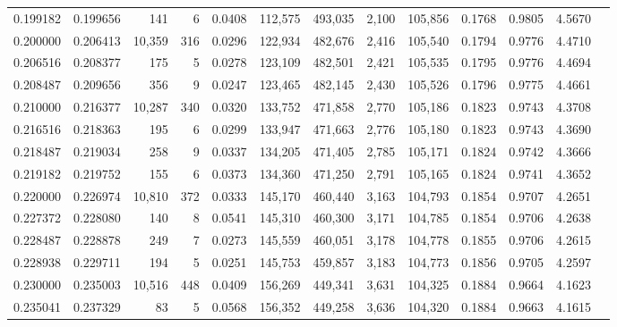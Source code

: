 \begin{tabular}{rrrrrrrrrrrrr}
0.199182 & 0.199656 &    141 &     6 &                                     0.0408 & 112,575 & 493,035 &   2,100 & 105,856 & 0.1768 & 0.9805 & 4.5670 \\
0.200000 & 0.206413 & 10,359 &   316 &                                     0.0296 & 122,934 & 482,676 &   2,416 & 105,540 & 0.1794 & 0.9776 & 4.4710 \\
0.206516 & 0.208377 &    175 &     5 &                                     0.0278 & 123,109 & 482,501 &   2,421 & 105,535 & 0.1795 & 0.9776 & 4.4694 \\
0.208487 & 0.209656 &    356 &     9 &                                     0.0247 & 123,465 & 482,145 &   2,430 & 105,526 & 0.1796 & 0.9775 & 4.4661 \\
0.210000 & 0.216377 & 10,287 &   340 &                                     0.0320 & 133,752 & 471,858 &   2,770 & 105,186 & 0.1823 & 0.9743 & 4.3708 \\
0.216516 & 0.218363 &    195 &     6 &                                     0.0299 & 133,947 & 471,663 &   2,776 & 105,180 & 0.1823 & 0.9743 & 4.3690 \\
0.218487 & 0.219034 &    258 &     9 &                                     0.0337 & 134,205 & 471,405 &   2,785 & 105,171 & 0.1824 & 0.9742 & 4.3666 \\
0.219182 & 0.219752 &    155 &     6 &                                     0.0373 & 134,360 & 471,250 &   2,791 & 105,165 & 0.1824 & 0.9741 & 4.3652 \\
0.220000 & 0.226974 & 10,810 &   372 &                                     0.0333 & 145,170 & 460,440 &   3,163 & 104,793 & 0.1854 & 0.9707 & 4.2651 \\
0.227372 & 0.228080 &    140 &     8 &                                     0.0541 & 145,310 & 460,300 &   3,171 & 104,785 & 0.1854 & 0.9706 & 4.2638 \\
0.228487 & 0.228878 &    249 &     7 &                                     0.0273 & 145,559 & 460,051 &   3,178 & 104,778 & 0.1855 & 0.9706 & 4.2615 \\
0.228938 & 0.229711 &    194 &     5 &                                     0.0251 & 145,753 & 459,857 &   3,183 & 104,773 & 0.1856 & 0.9705 & 4.2597 \\
0.230000 & 0.235003 & 10,516 &   448 &                                     0.0409 & 156,269 & 449,341 &   3,631 & 104,325 & 0.1884 & 0.9664 & 4.1623 \\
0.235041 & 0.237329 &     83 &     5 &                                     0.0568 & 156,352 & 449,258 &   3,636 & 104,320 & 0.1884 & 0.9663 & 4.1615 \\

\end{tabular}

